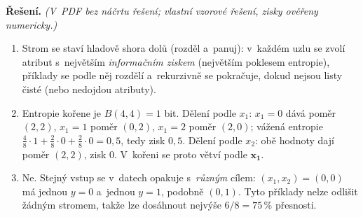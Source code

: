 \medskip
\noindent\textbf{Řešení.} \textit{(V~PDF bez náčrtu řešení; vlastní vzorové řešení, zisky ověřeny numericky.)}\par
\begin{enumerate}[nosep]
  \item Strom se staví hladově shora dolů (rozděl a~panuj): v~každém uzlu se zvolí atribut s~největším \emph{informačním ziskem} (největším poklesem entropie), příklady se podle něj rozdělí a~rekurzivně se pokračuje, dokud nejsou listy čisté (nebo nedojdou atributy).
  \item Entropie kořene je $B(4,4)=1$ bit. Dělení podle $x_1$: $x_1{=}0$ dává poměr $(2,2)$, $x_1{=}1$ poměr $(0,2)$, $x_1{=}2$ poměr $(2,0)$; vážená entropie $\tfrac48\cdot1+\tfrac28\cdot0+\tfrac28\cdot0=0{,}5$, tedy zisk $0{,}5$. Dělení podle $x_2$: obě hodnoty dají poměr $(2,2)$, zisk $0$. V~kořeni se proto větví podle $\boldsymbol{x_1}$.
  \item Ne. Stejný vstup se v~datech opakuje s~\emph{různým} cílem: $(x_1,x_2)=(0,0)$ má jednou $y{=}0$ a~jednou $y{=}1$, podobně $(0,1)$. Tyto příklady nelze odlišit žádným stromem, takže lze dosáhnout nejvýše $6/8=75\,\%$ přesnosti.
\end{enumerate}
